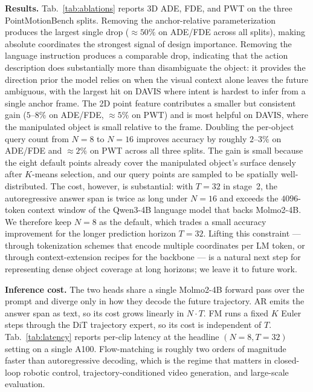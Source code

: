 \documentclass{llmxive}
\providecommand{\benchmarkname}{PointMotionBench\xspace}
\begin{document}
\noindent\textbf{Results.}
Tab.~\ref{tab:ablations} reports 3D ADE, FDE, and PWT on the three
\benchmarkname{} splits. Removing the anchor-relative parameterization produces
the largest single drop ($\approx 50\%$ on ADE/FDE across all splits), making
absolute coordinates the strongest signal of design importance. Removing the
language instruction produces a comparable drop, indicating that the action
description does substantially more than disambiguate the object: it provides
the direction prior the model relies on when the visual context alone leaves
the future ambiguous, with the largest hit on DAVIS where intent is hardest to
infer from a single anchor frame. The 2D point feature contributes a smaller
but consistent gain ($5$--$8\%$ on ADE/FDE, $\approx 5\%$ on PWT) and is most
helpful on DAVIS, where the manipulated object is small relative to the frame.
Doubling the per-object query count from $N=8$ to $N=16$ improves accuracy by
roughly $2$--$3\%$ on ADE/FDE and $\approx 2\%$ on PWT across all three
splits. The gain is small because the eight default points already cover the
manipulated object's surface densely after $K$-means selection, and our query
points are sampled to be spatially well-distributed. The cost, however, is
substantial: with $T=32$ in stage~2, the autoregressive answer span is twice
as long under $N=16$ and exceeds the $4096$-token context window of the
Qwen3-4B language model that backs Molmo2-4B. We therefore keep $N=8$ as the
default, which trades a small accuracy improvement for the longer prediction
horizon $T=32$. Lifting this constraint --- through tokenization schemes that
encode multiple coordinates per LM token, or through context-extension
recipes for the backbone --- is a natural next step for representing dense
object coverage at long horizons; we leave it to future work.

\noindent\textbf{Inference cost.}
The two heads share a single Molmo2-4B forward pass over the prompt and
diverge only in how they decode the future trajectory. AR emits the
answer span as text, so its cost grows linearly in $N{\cdot}T$. FM runs
a fixed $K$ Euler steps through the DiT trajectory expert, so its cost
is independent of $T$. Tab.~\ref{tab:latency} reports per-clip latency
at the headline $(N{=}8, T{=}32)$ setting on a single A100. Flow-matching
is roughly two orders of magnitude faster than autoregressive decoding,
which is the regime that matters in closed-loop robotic control,
trajectory-conditioned video generation, and large-scale evaluation.
\end{document}

